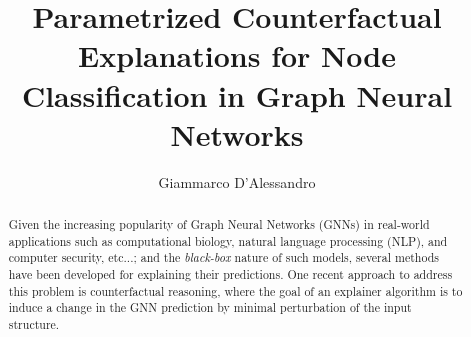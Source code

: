 \documentclass[binding=0.6cm,LaM]{sapthesis}
\title{Parametrized Counterfactual Explanations for Node Classification in Graph Neural Networks}
\author{Giammarco D'Alessandro}
\begin{document}
\frontmatter
\maketitle
\dedication{Dedicato a\\ Donald Knuth}

\begin{abstract}
Given the increasing popularity of Graph Neural Networks (GNNs) in real-world applications such as computational biology, natural language processing (NLP), and computer security, etc...; and the \textit{black-box} nature of such models, several methods have been developed for explaining their predictions. One recent approach to address this problem is counterfactual reasoning, where the goal of an explainer algorithm is to induce a change in the GNN prediction by minimal perturbation of the input structure. 


\end{abstract}
\end{document}
